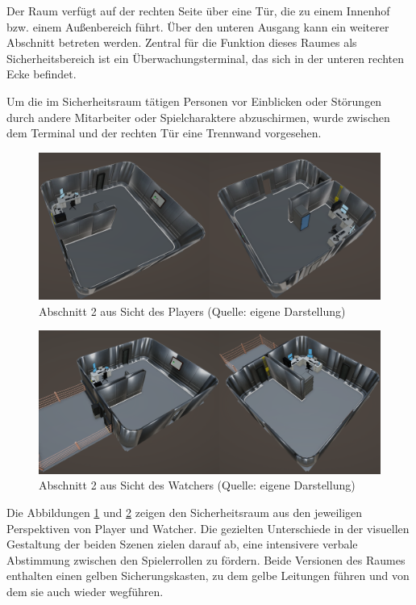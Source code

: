 Der Raum verfügt auf der rechten Seite über eine Tür, die zu einem Innenhof bzw. einem Außenbereich führt. Über den unteren Ausgang kann ein weiterer Abschnitt betreten werden. Zentral für die Funktion dieses Raumes als Sicherheitsbereich ist ein Überwachungsterminal, das sich in der unteren rechten Ecke befindet.

Um die im Sicherheitsraum tätigen Personen vor Einblicken oder Störungen durch andere Mitarbeiter oder Spielcharaktere abzuschirmen, wurde zwischen dem Terminal und der rechten Tür eine Trennwand vorgesehen.

\begin{figure}[ht]
\centering
\includegraphics[width=1\linewidth]{content/pictures/Abschnitt_01 - Player.png}
\caption{Abschnitt 2 aus Sicht des Players (Quelle: eigene Darstellung)}
\label{fig:section_01_player}
\end{figure}

\begin{figure}[ht]
\centering
\includegraphics[width=1\linewidth]{content/pictures/Abschnitt_01 - Watcher.png}
\caption{Abschnitt 2 aus Sicht des Watchers (Quelle: eigene Darstellung)}
\label{fig:section_01_watcher}
\end{figure}

Die Abbildungen \ref{fig:section_01_player} und \ref{fig:section_01_watcher} zeigen den Sicherheitsraum aus den jeweiligen Perspektiven von Player und Watcher. Die gezielten Unterschiede in der visuellen Gestaltung der beiden Szenen zielen darauf ab, eine intensivere verbale Abstimmung zwischen den Spielerrollen zu fördern. Beide Versionen des Raumes enthalten einen gelben Sicherungskasten, zu dem gelbe Leitungen führen und von dem sie auch wieder wegführen.

